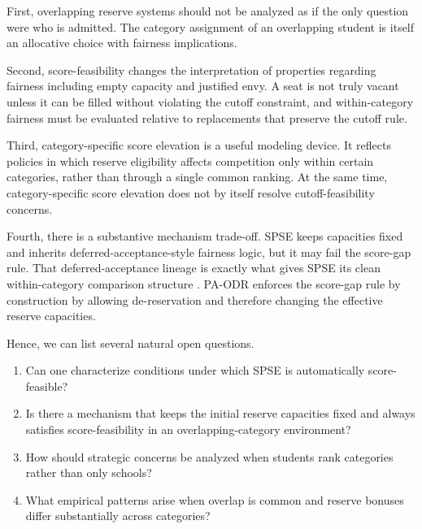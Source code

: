 \documentclass[12pt]{article}
\newcommand{\1}{\mathbf{1}}
\begin{document}
First, overlapping reserve systems should not be analyzed as if the only question were who is admitted. The category assignment of an overlapping student is itself an allocative choice with fairness implications.

Second, score-feasibility changes the interpretation of properties regarding fairness including empty capacity and justified envy. A seat is not truly vacant unless it can be filled without violating the cutoff constraint, and within-category fairness must be evaluated relative to replacements that preserve the cutoff rule.

Third, category-specific score elevation is a useful modeling device. It reflects policies in which reserve eligibility affects competition only within certain categories, rather than through a single common ranking. At the same time, category-specific score elevation does not by itself resolve cutoff-feasibility concerns.

Fourth, there is a substantive mechanism trade-off. SPSE keeps capacities fixed and inherits deferred-acceptance-style fairness logic, but it may fail the score-gap rule. That deferred-acceptance lineage is exactly what gives SPSE its clean within-category comparison structure \citep{GaSh62a,AbSo03b,Roth08a}. PA-ODR enforces the score-gap rule by construction by allowing de-reservation and therefore changing the effective reserve capacities.

Hence, we can list several natural open questions.

\begin{enumerate}
\item Can one characterize conditions under which SPSE is automatically score-feasible?
\item Is there a mechanism that keeps the initial reserve capacities fixed and always satisfies score-feasibility in an overlapping-category environment?
\item How should strategic concerns be analyzed when students rank categories rather than only schools?
\item What empirical patterns arise when overlap is common and reserve bonuses differ substantially across categories?
\end{enumerate}

\end{document}

